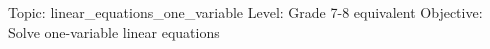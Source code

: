 Topic: linear_equations_one_variable
Level: Grade 7-8 equivalent
Objective: Solve one-variable linear equations

